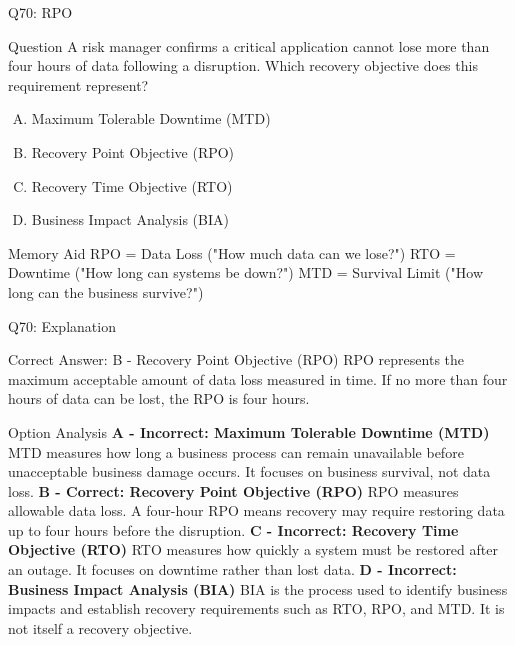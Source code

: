 \documentclass{beamer}
\begin{document}
	
	\begin{frame}{Q70: RPO} \begin{block}{Question} A risk manager confirms a critical application cannot lose more than four hours of data following a disruption. Which recovery objective does this requirement represent? \end{block} \begin{enumerate}[(A)] \item Maximum Tolerable Downtime (MTD) \item Recovery Point Objective (RPO) \item Recovery Time Objective (RTO) \item Business Impact Analysis (BIA) \end{enumerate} \begin{block}{Memory Aid} RPO = Data Loss ("How much data can we lose?") RTO = Downtime ("How long can systems be down?") MTD = Survival Limit ("How long can the business survive?") \end{block} \end{frame} \begin{frame}{Q70: Explanation} \footnotesize \begin{block}{Correct Answer: B - Recovery Point Objective (RPO)} RPO represents the maximum acceptable amount of data loss measured in time. If no more than four hours of data can be lost, the RPO is four hours. \end{block} \begin{block}{Option Analysis} \textbf{A - Incorrect: Maximum Tolerable Downtime (MTD)} MTD measures how long a business process can remain unavailable before unacceptable business damage occurs. It focuses on business survival, not data loss. \vspace{0.15cm} \textbf{B - Correct: Recovery Point Objective (RPO)} RPO measures allowable data loss. A four-hour RPO means recovery may require restoring data up to four hours before the disruption. \vspace{0.15cm} \textbf{C - Incorrect: Recovery Time Objective (RTO)} RTO measures how quickly a system must be restored after an outage. It focuses on downtime rather than lost data. \vspace{0.15cm} \textbf{D - Incorrect: Business Impact Analysis (BIA)} BIA is the process used to identify business impacts and establish recovery requirements such as RTO, RPO, and MTD. It is not itself a recovery objective. \end{block}  \end{frame}
	
\end{document}
